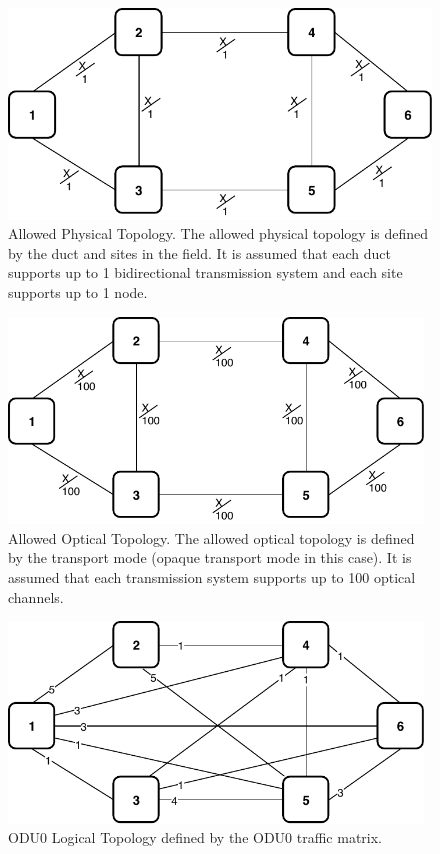 \vspace{11pt}
\begin{figure}[h!]
\centering
\includegraphics[width=12cm]{sdf/ilp/opaque_protection/figures/allowed_physical_topology}
\caption{Allowed Physical Topology. The allowed physical topology is defined by the duct and sites in the field. It is assumed that each duct supports up to 1 bidirectional transmission system and each site supports up to 1 node.}
\label{allowed_physical_protectionlow}
\end{figure}
\newpage
\begin{figure}[h!]
\centering
\includegraphics[width=11cm]{sdf/ilp/opaque_protection/figures/allowed_optical_topology}
\caption{Allowed Optical Topology. The allowed optical topology is defined by the transport mode (opaque transport mode in this case). It is assumed that each transmission system supports up to 100 optical channels.}
\label{allowed_optical_protectionlow}
\end{figure}

\begin{figure}[h!]
\centering
\includegraphics[width=11cm]{sdf/ilp/opaque_protection/figures/logical_topology_ODU0_low}
\caption{ODU0 Logical Topology defined by the ODU0 traffic matrix.}
\label{logical_ODU0_protectionlow}
\end{figure}

